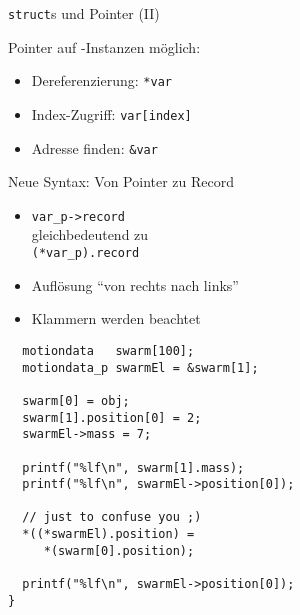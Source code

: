 \begin{frame}[fragile]{\texttt{struct}s und Pointer (II)}
%
\vspace{-5pt}
\begin{tcbraster}[raster columns=2,
                  raster equal height,
                  nobeforeafter
                 ]
\begin{tcolorbox}[title=Arrays von \texttt{struct}-Instanzen]
\small
Pointer auf -Instanzen möglich:
\begin{itemize}
\item Dereferenzierung: 
	\tabto{3cm}
	\texttt{*var}
\item Index-Zugriff: 
	\tabto{3cm}
	\texttt{var[index]}
\item Adresse finden: 
	\tabto{3cm}
	\texttt{\&var}
\end{itemize}
Neue Syntax: Von Pointer zu Record
\begin{itemize}
\item \texttt{var\_p->record} \\
	gleichbedeutend zu \\
	\texttt{(*var\_p).record}
\item Auflösung \enquote{von rechts nach links}
\item Klammern werden beachtet
\end{itemize}
\end{tcolorbox}
%
\begin{codebox}[Code]
\begin{verbatim}
  motiondata   swarm[100];
  motiondata_p swarmEl = &swarm[1];

  swarm[0] = obj;
  swarm[1].position[0] = 2;
  swarmEl->mass = 7;

  printf("%lf\n", swarm[1].mass);
  printf("%lf\n", swarmEl->position[0]);

  // just to confuse you ;)
  *((*swarmEl).position) = 
     *(swarm[0].position);

  printf("%lf\n", swarmEl->position[0]);
}
\end{verbatim}
\end{codebox}
\end{tcbraster}
%
\end{frame}


